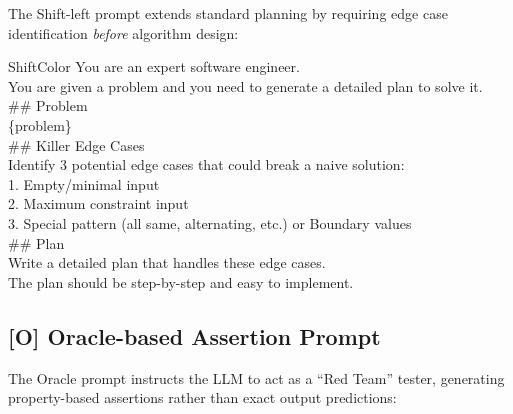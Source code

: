 \documentclass[11pt]{article}
\begin{document}
The Shift-left prompt extends standard planning by requiring edge case identification \textit{before} algorithm design:

\begin{promptbox}[title={\textcolor{white}{[S] Shift-left Planning Prompt}}]{ShiftColor}
\small\ttfamily
You are an expert software engineer.\\
You are given a problem and you need to generate a detailed plan to solve it.\\[0.5em]
\#\# Problem\\
\{problem\}\\[0.5em]
\#\# Killer Edge Cases\\
Identify 3 potential edge cases that could break a naive solution:\\
1. Empty/minimal input\\
2. Maximum constraint input\\
3. Special pattern (all same, alternating, etc.) or Boundary values\\[0.5em]
\#\# Plan\\
Write a detailed plan that handles these edge cases.\\
The plan should be step-by-step and easy to implement.
\end{promptbox}

\subsection{[O] Oracle-based Assertion Prompt}

The Oracle prompt instructs the LLM to act as a ``Red Team'' tester, generating property-based assertions rather than exact output predictions:
\end{document}
